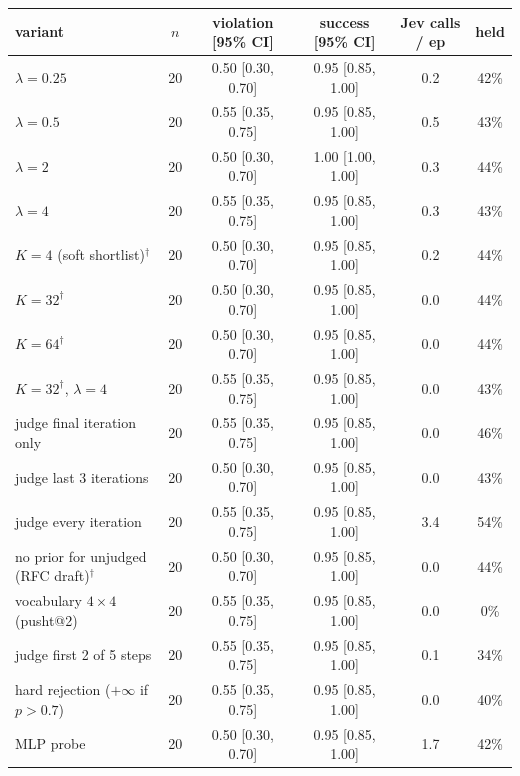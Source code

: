 \begin{tabular}{lccccc}
\toprule
variant & $n$ & violation [95\% CI] & success [95\% CI] & Jev calls / ep & held \\
\midrule
$\lambda=0.25$ & 20 & 0.50 {\scriptsize[0.30, 0.70]} & 0.95 {\scriptsize[0.85, 1.00]} & 0.2 & 42\% \\
$\lambda=0.5$ & 20 & 0.55 {\scriptsize[0.35, 0.75]} & 0.95 {\scriptsize[0.85, 1.00]} & 0.5 & 43\% \\
$\lambda=2$ & 20 & 0.50 {\scriptsize[0.30, 0.70]} & 1.00 {\scriptsize[1.00, 1.00]} & 0.3 & 44\% \\
$\lambda=4$ & 20 & 0.55 {\scriptsize[0.35, 0.75]} & 0.95 {\scriptsize[0.85, 1.00]} & 0.3 & 43\% \\
$K=4$ (soft shortlist)$^\dagger$ & 20 & 0.50 {\scriptsize[0.30, 0.70]} & 0.95 {\scriptsize[0.85, 1.00]} & 0.2 & 44\% \\
$K=32^\dagger$ & 20 & 0.50 {\scriptsize[0.30, 0.70]} & 0.95 {\scriptsize[0.85, 1.00]} & 0.0 & 44\% \\
$K=64^\dagger$ & 20 & 0.50 {\scriptsize[0.30, 0.70]} & 0.95 {\scriptsize[0.85, 1.00]} & 0.0 & 44\% \\
$K=32^\dagger$, $\lambda=4$ & 20 & 0.55 {\scriptsize[0.35, 0.75]} & 0.95 {\scriptsize[0.85, 1.00]} & 0.0 & 43\% \\
judge final iteration only & 20 & 0.55 {\scriptsize[0.35, 0.75]} & 0.95 {\scriptsize[0.85, 1.00]} & 0.0 & 46\% \\
judge last 3 iterations & 20 & 0.50 {\scriptsize[0.30, 0.70]} & 0.95 {\scriptsize[0.85, 1.00]} & 0.0 & 43\% \\
judge every iteration & 20 & 0.55 {\scriptsize[0.35, 0.75]} & 0.95 {\scriptsize[0.85, 1.00]} & 3.4 & 54\% \\
no prior for unjudged (RFC draft)$^\dagger$ & 20 & 0.50 {\scriptsize[0.30, 0.70]} & 0.95 {\scriptsize[0.85, 1.00]} & 0.0 & 44\% \\
vocabulary $4\times4$ (pusht@2) & 20 & 0.55 {\scriptsize[0.35, 0.75]} & 0.95 {\scriptsize[0.85, 1.00]} & 0.0 & 0\% \\
judge first 2 of 5 steps & 20 & 0.55 {\scriptsize[0.35, 0.75]} & 0.95 {\scriptsize[0.85, 1.00]} & 0.1 & 34\% \\
hard rejection ($+\infty$ if $p>0.7$) & 20 & 0.55 {\scriptsize[0.35, 0.75]} & 0.95 {\scriptsize[0.85, 1.00]} & 0.0 & 40\% \\
MLP probe & 20 & 0.50 {\scriptsize[0.30, 0.70]} & 0.95 {\scriptsize[0.85, 1.00]} & 1.7 & 42\% \\
\bottomrule
\end{tabular}